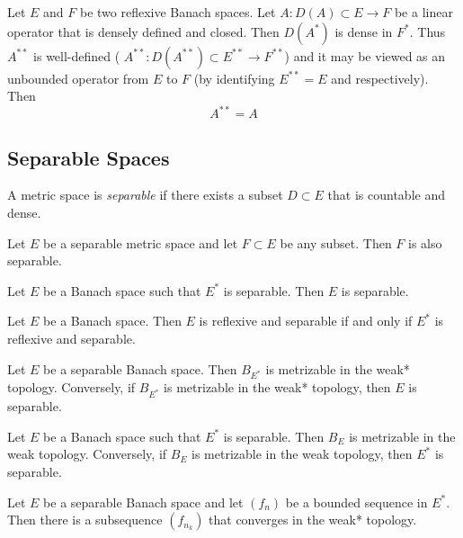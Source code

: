 \begin{thm}
	Let $ E $ and $ F $ be two reflexive Banach spaces. Let $ A: D(A) \subset E \to F $ be a linear operator that is densely defined and closed. Then $ D(A^{*}) $ is dense in $ F^{*} $. Thus $ A^{**} $ is well-defined ( $ A^{**}: D(A^{**}) \subset E^{**} \to F^{**} $) and it may be viewed as an unbounded operator from $ E $ to $ F $ (by identifying $ E^{**}= E $ and respectively). Then
	\[
	A^{**} = A
	\]
	
\end{thm}

\subsection{Separable Spaces}

\begin{defn}
A metric space is \textit{separable} if there exists a subset $ D \subset E $ that is countable and dense.
\end{defn}

\begin{prop}
Let $ E $ be a separable metric space and let $ F \subset E $ be any subset. Then $ F $ is also separable.
\end{prop}

\begin{thm}
Let $ E $ be a Banach space such that $ E^{*} $ is separable. Then $ E $ is separable.
\end{thm}

\begin{cor}
Let $ E $ be a Banach space. Then $ E $ is reflexive and separable if and only if $ E^{*} $ is reflexive and separable.
\end{cor}

\begin{thm}
Let $ E $ be a separable Banach space. Then $ B_{E^{*}} $ is metrizable in the weak* topology. Conversely, if $ B_{E^{*}} $ is metrizable in the weak* topology, then $ E $ is separable.
\end{thm}

\begin{thm}
Let $ E $ be a Banach space such that $ E^{*} $ is separable. Then $ B_{E} $ is metrizable in the weak topology. Conversely, if $ B_{E} $ is metrizable in the weak topology, then $ E^{*} $ is separable.
\end{thm}

\begin{cor}
	Let $ E $ be a separable Banach space and let $ (f_{n}) $ be a bounded sequence in $ E^{*} $. Then there is a subsequence $ (f_{n_{k}}) $ that converges in the weak* topology.
\end{cor}

